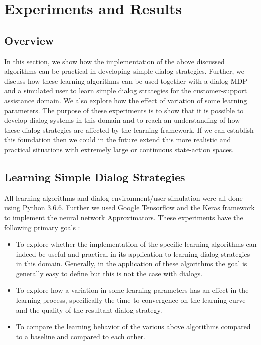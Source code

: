 \documentclass[12pt]{extarticle}
\numberwithin{equation}{section}
\begin{document}
	
	\pagebreak
	\section{Experiments and Results}
	\subsection{Overview}
		In this section, we show how the implementation of the above discussed algorithms can be practical in developing simple dialog strategies. Further, we discuss how these learning algorithms can be used together with a dialog MDP and a simulated user to learn simple dialog strategies for the customer-support assistance domain. We also explore how the effect of variation of some learning parameters. The purpose of these experiments is to show that it is possible to develop dialog systems in this domain and to reach an understanding of how these dialog strategies are affected by the learning framework. If we can establish this foundation then we could in the future extend this more realistic and practical situations with extremely large or continuous state-action spaces.
	\subsection{Learning Simple Dialog Strategies}
	All learning algorithms and dialog environment/user simulation were all done using Python 3.6.6\cite{python}. Further we used Google Tensorflow\cite{tensorflow} and the Keras framework\cite{keras} to implement the neural network Approximators. These experiments have the following primary goals :
	\begin{itemize}
		\item To explore whether the implementation of the specific learning algorithms can indeed be useful and practical in its application to learning dialog strategies in this domain. Generally, in the application of these algorithms the goal is generally easy to define but this is not the case with dialogs.
		\item To explore how a variation in some learning parameters has an effect in the learning process, specifically the time to convergence on the learning curve and the quality of the resultant dialog strategy.
		\item To compare the learning behavior of the various above algorithms compared to a baseline and compared to each other.
	\end{itemize}
\end{document}
